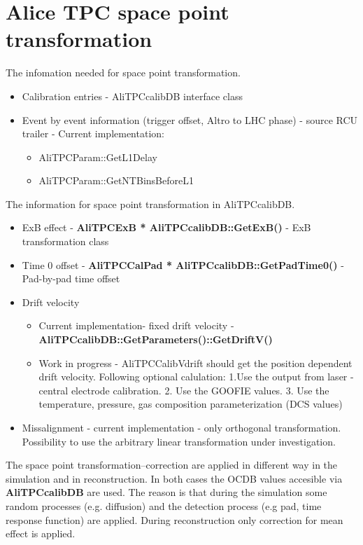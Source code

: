 \documentclass{elsart}
\begin{document}
\section{ Alice TPC space point transformation}

The infomation needed for space point transformation.

\begin{itemize}
\item  Calibration entries - AliTPCcalibDB interface class
\item  Event by event information (trigger offset, Altro to LHC phase) - source RCU trailer - Current implementation:  
\begin{itemize}
\item  AliTPCParam::GetL1Delay
\item  AliTPCParam::GetNTBinsBeforeL1
\end{itemize}
\end{itemize}


The information for space point transformation in AliTPCcalibDB.
\begin{itemize}
\item ExB effect - {\bf{AliTPCExB * AliTPCcalibDB::GetExB()}} - ExB transformation class
\item Time 0 offset - {\bf{AliTPCCalPad * AliTPCcalibDB::GetPadTime0()}} -Pad-by-pad time offset
\item Drift velocity
\begin{itemize}
\item Current implementation- fixed drift velocity -  {\bf{AliTPCcalibDB::GetParameters()::GetDriftV()}}
\item Work in progress - AliTPCCalibVdrift should get the position dependent 
drift velocity. Following optional calulation: 1.Use the output from laser -  central electrode calibration.  2. Use the GOOFIE values. 3. Use the temperature, pressure, gas composition parameterization (DCS values)
\end{itemize}
\item Missalignment - current implementation - only orthogonal transformation.
      Possibility to use the arbitrary linear transformation under investigation.
\end{itemize}


The space point transformation--correction are applied in different way in the simulation and in reconstruction. In both cases the OCDB values accesible via {\bf{AliTPCcalibDB}} are used. The reason is that during the simulation some random processes (e.g. diffusion) and the detection process (e.g pad, time response function) are applied. During reconstruction only correction for mean effect is applied. 
\end{document}
